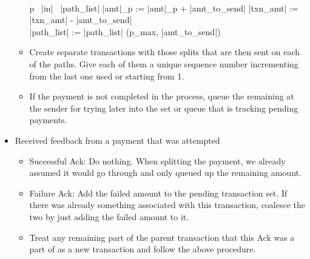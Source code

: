 \documentclass[a4paper]{article}
\begin{document}
\begin{itemize}
\begin{itemize}
\begin{program}
                  ~\\
                  \FOR p \  |in| \ |path_list| \DO
		    |amt|_p := |amt|_p + |amt_to_send|
		    |txn_amt| := |txn_amt| - |amt_to_send|
		  \END
                  ~\\

		  |path_list| := |path_list| \cup (p_{max}, |amt_to_send|)
		\END
            \END

		\end{program}

            \item Create separate transactions with those splits that are then sent on each of the paths. Give each of them a unique sequence number incrementing from the last one used or starting
                from 1.
            \item If the payment is not completed in the process, queue the remaining at the sender for trying later into the set or queue that is tracking pending payments.
        \end{itemize}

    \item Received feedback from a payment that was attempted
        \begin{itemize}
            \item Successful Ack: Do nothing. When splitting the payment, we already assumed it would go through and only queued up the remaining amount.
            \item Failure Ack: Add the failed amount to the pending transaction set. If there was already something associated with this transaction, coalesce the two by just adding the failed amount to it.
            \item Treat any remaining part of the parent transaction that this Ack was a part of as a new transaction and follow the above procedure.
        \end{itemize}
\end{itemize}
\end{document}

